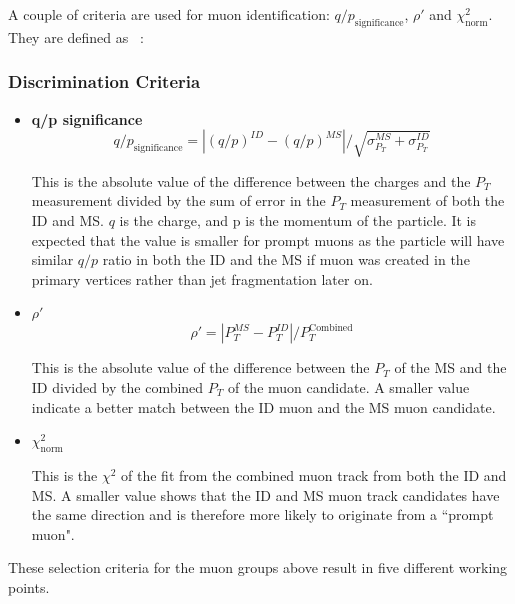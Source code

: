 A couple of criteria are used for muon identification: $q/p_{\textrm{significance}}$, $\rho'$ and $\chi^{2}_{\textrm{norm}}$. They are defined as ~\cite{muonReco2016}:

\subsubsection*{Discrimination Criteria}
\begin{itemize}

\item \textbf{q/p significance}
    \begin{equation}
    q/p_{\textrm{significance}} = |(q/p)^{ID} - (q/p)^{MS}|/\sqrt{\sigma^{MS}_{P_{T}} + \sigma^{ID}_{P_{T}}}
    \end{equation}

    This is the absolute value of the difference between the charges and the $P_{T}$ measurement divided by the sum of error in the $P_{T}$ measurement of both the ID and MS. $q$ is the charge, and p is the momentum of the particle. It is expected that the value is smaller for prompt muons as the particle will have similar $q/p$ ratio in both the ID and the MS if muon was created in the primary vertices rather than jet fragmentation later on. 

\item \textbf{$\rho'$}
    \begin{equation}
        \rho' = |P_{T}^{MS} - P_{T}^{ID}| / P_{T}^{\textrm{Combined}}
    \end{equation}

This is the absolute value of the difference between the $P_{T}$ of the MS and the ID divided by the combined $P_{T}$ of the muon candidate. A smaller value indicate a better match between the ID muon and the MS muon candidate.

\item \textbf{$\chi_{\textrm{norm}}^{2}$}

    This is the $\chi^{2}$ of the fit from the combined muon track from both the ID and MS. A smaller value shows that the ID and MS muon track candidates have the same direction and is therefore more likely to originate from a ``prompt muon".

\end{itemize}

These selection criteria for the muon groups above result in five different working points.


